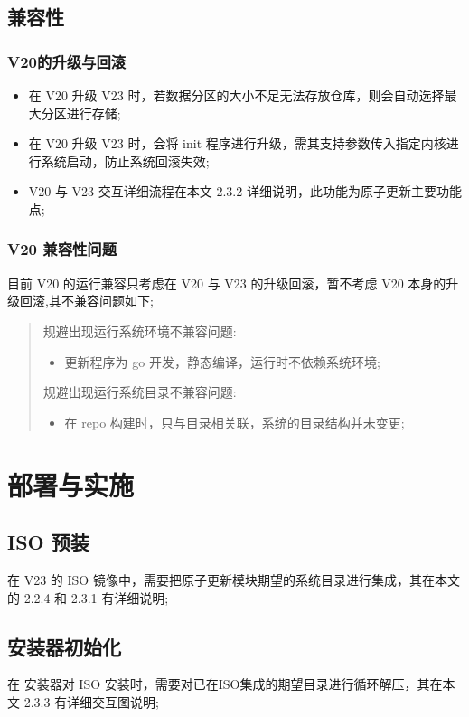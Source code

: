 \documentclass{utart}
\begin{document}
\subsection{兼容性}

  \subsubsection{V20的升级与回滚}
    \begin{itemize}
      \item 在 V20 升级 V23 时，若数据分区的大小不足无法存放仓库，则会自动选择最大分区进行存储;
      \item 在 V20 升级 V23 时，会将 init 程序进行升级，需其支持参数传入指定内核进行系统启动，防止系统回滚失效;
      \item V20 与 V23 交互详细流程在本文 2.3.2 详细说明，此功能为原子更新主要功能点;
    \end{itemize}
  \subsubsection{V20 兼容性问题}
  目前 V20 的运行兼容只考虑在 V20 与 V23 的升级回滚，暂不考虑 V20 本身的升级回滚,其不兼容问题如下;
  \begin{quote}
    规避出现运行系统环境不兼容问题:
    \begin{itemize}
      \item 更新程序为 go 开发，静态编译，运行时不依赖系统环境;
    \end{itemize}
    规避出现运行系统目录不兼容问题:
    \begin{itemize}
      \item 在 repo 构建时，只与目录相关联，系统的目录结构并未变更;
    \end{itemize}
    \end{quote}

\section{部署与实施}
\subsection{ISO 预装}
    在 V23 的 ISO 镜像中，需要把原子更新模块期望的系统目录进行集成，其在本文的 2.2.4 和 2.3.1 有详细说明;
\subsection{安装器初始化}
    在 安装器对 ISO 安装时，需要对已在ISO集成的期望目录进行循环解压，其在本文 2.3.3 有详细交互图说明;
\end{document}
